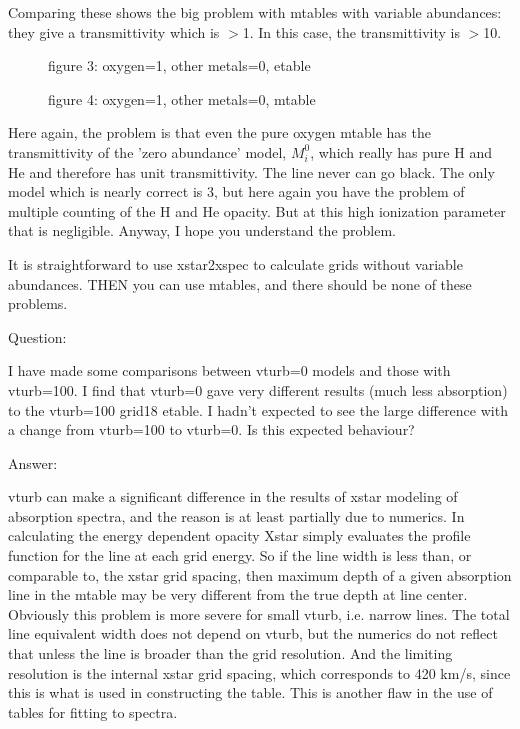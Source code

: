 Comparing these shows the big problem with mtables with variable abundances:  they give a 
transmittivity which is $>$1.  In this case, the transmittivity is $>$10.

\begin{figure}
\epsfxsize=5.6in  %
\epsfysize=7.0in  %
\caption{figure 3: oxygen=1, other metals=0, etable}
\label{fig:3 oxygen=1, other metals=0, etable}
\end{figure}

\begin{figure}
\epsfxsize=5.6in  %
\epsfysize=7.0in  %
\caption{figure 4: oxygen=1, other metals=0, mtable}
\label{fig:4 oxygen=1, other metals=0, mtable}
\end{figure}


Here again, the problem is that even the pure oxygen mtable has the 
transmittivity of the 'zero abundance' model, $M_i^0$, which really has pure 
H and He and therefore has unit transmittivity.  The line never can go 
black.  The only model which is nearly correct is 3, but here again you 
have the problem of multiple counting of the H and He opacity.  But at 
this high ionization parameter that is negligible.  Anyway, I hope you 
understand the problem. 

It is straightforward to use xstar2xspec to calculate grids without 
variable abundances.  THEN you can use mtables, and there should be none 
of these problems.


Question:

I have made some comparisons between vturb=0 models and 
those with vturb=100.  I find that vturb=0  gave very different results 
(much less absorption) to the vturb=100 grid18 etable.  I 
hadn't expected to see the large difference with a change from vturb=100 
to vturb=0. Is this expected behaviour? 

Answer:

vturb can make a significant difference in the results of xstar modeling 
of absorption spectra, and the reason is at least 
partially due to numerics.  In calculating the energy dependent opacity  Xstar simply 
evaluates the profile function for the line at each grid energy.  So 
if the line width is less than, or comparable to, the xstar grid spacing, 
then maximum depth of a given absorption line in the mtable  may be very 
different from the true depth at line center.  Obviously this problem is 
more severe for small vturb, i.e. narrow lines.  The total line equivalent 
width does not depend on vturb, but the numerics do not reflect that 
unless the line is broader than the grid resolution.  And the limiting 
resolution is the internal xstar grid spacing, which corresponds to 420 
km/s, since this is what is used in constructing the table.  This is 
another flaw in the use of tables for fitting to spectra.   

